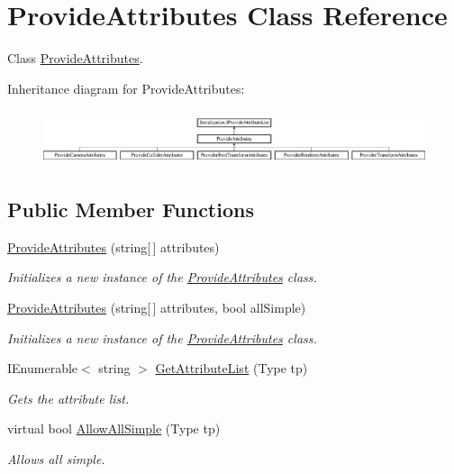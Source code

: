 \hypertarget{class_provide_attributes}{}\section{Provide\+Attributes Class Reference}
\label{class_provide_attributes}


Class \hyperlink{class_provide_attributes}{Provide\+Attributes}.  


Inheritance diagram for Provide\+Attributes\+:\begin{figure}[H]
\begin{center}
\leavevmode
\includegraphics[height=1.631068cm]{class_provide_attributes}
\end{center}
\end{figure}
\subsection*{Public Member Functions}
\begin{DoxyCompactItemize}
\item 
\hyperlink{class_provide_attributes_af23612d88d5f7699f6344fa0472888df}{Provide\+Attributes} (string\mbox{[}$\,$\mbox{]} attributes)
\begin{DoxyCompactList}\small\item\em Initializes a new instance of the \hyperlink{class_provide_attributes}{Provide\+Attributes} class. \end{DoxyCompactList}\item 
\hyperlink{class_provide_attributes_ab743242073ce772ded09b371409283ad}{Provide\+Attributes} (string\mbox{[}$\,$\mbox{]} attributes, bool all\+Simple)
\begin{DoxyCompactList}\small\item\em Initializes a new instance of the \hyperlink{class_provide_attributes}{Provide\+Attributes} class. \end{DoxyCompactList}\item 
I\+Enumerable$<$ string $>$ \hyperlink{class_provide_attributes_aa43c5b30e202787ad574923f414c7eb3}{Get\+Attribute\+List} (Type tp)
\begin{DoxyCompactList}\small\item\em Gets the attribute list. \end{DoxyCompactList}\item 
virtual bool \hyperlink{class_provide_attributes_a9b4c8e178f74bc4fc69ed9b2747f173d}{Allow\+All\+Simple} (Type tp)
\begin{DoxyCompactList}\small\item\em Allows all simple. \end{DoxyCompactList}\end{DoxyCompactItemize}
